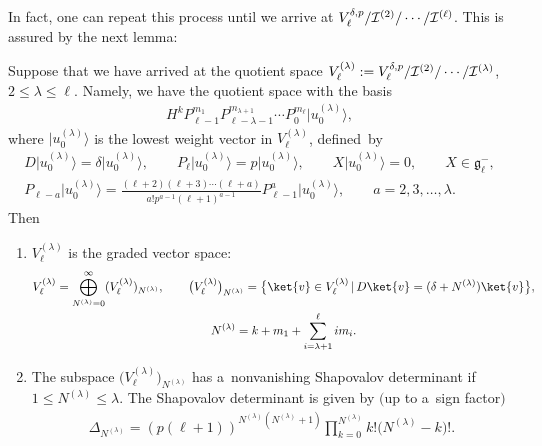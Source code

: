 In fact, one can repeat this process until we arrive at $ V^{\delta,p}_{\ell}/{\cal I}^{(2)}/\cdots/{\cal I}^{(\ell)}$.
This is assured by the next lemma:
\begin{lemma}
\label{lemma5}
Suppose that we have arrived at the quotient space $ V_{\ell}^{(\lambda)}:= V^{\delta,p}_{\ell}/{\cal
I}^{(2)}/\cdots/{\cal I}^{(\lambda)}$, $2 \leq \lambda \leq \ell$.
Namely, we have the quotient space with the basis
\begin{gather*}
H^k P_{\ell-1}^{m_1} P_{\ell-\lambda-1}^{m_{\lambda+1}} \cdots P_0^{m_{\ell}} \big|u_0^{(\lambda)}\big\rangle ,
\end{gather*}
where $ \big|u_0^{(\lambda)}\big\rangle  $ is the lowest weight vector in $ V_{\ell}^{(\lambda)} $, defined~by
\begin{gather}
    D \big|u_0^{(\lambda)}\big\rangle  = \delta \big|u_0^{(\lambda)}\big\rangle ,
\qquad
P_{\ell} \big|u_0^{(\lambda)}\big\rangle  = p \big|u_0^{(\lambda)}\big\rangle ,
\qquad
X \big|u_0^{(\lambda)}\big\rangle  = 0, \qquad X \in {\mathfrak g}_{\ell}^-,
\nonumber
\\      P_{\ell-a} \big|u_0^{(\lambda)}\big\rangle  = \frac{(\ell+2) (\ell+3) \cdots (\ell+a)}{a!   p^{a-1}   (\ell+1)^{a-1}}
P_{\ell-1}^a \big|u_0^{(\lambda)}\big\rangle ,
\qquad
a = 2, 3, \dots, \lambda.
\label{Assumption-lambda}
\end{gather}
Then
\begin{enumerate}\itemsep=0pt
\item[$i)$] $ V_{\ell}^{(\lambda)} $ is the graded vector space:
\begin{gather*}
    V_{\ell}^{(\lambda)} = \bigoplus_{N^{(\lambda)}=0}^{\infty} (V_{\ell}^{(\lambda)})_{N^{(\lambda)}},
\qquad
\big(V_{\ell}^{(\lambda)}\big)_{N^{(\lambda)}} = \big\{ \ket{v} \in V_{\ell}^{(\lambda)} \, | \, D \ket{v} = (\delta +
N^{(\lambda)}) \ket{v} \big\},
\nonumber
\\
    N^{(\lambda)} = k + m_1 + \sum\limits_{i=\lambda+1}^{\ell} i m_i.
\end{gather*}
\item[$ii)$] The subspace $ \big(V_{\ell}^{(\lambda)}\big)_{N^{(\lambda)}} $ has a~nonvanishing Shapovalov determinant if $ 1 \leq
N^{(\lambda)} \leq \lambda$.
The Shapovalov determinant is given by $($up to a~sign factor$)$
\begin{gather}
\Delta_{N^{(\lambda)}} = (p  (\ell+1))^{N^{(\lambda)}(N^{(\lambda)}+1)} \prod\limits_{k=0}^{N^{(\lambda)}} k!
\big(N^{(\lambda)}-k\big)!.
\label{KDinQuotient}

\end{gather}
\end{enumerate}
\end{lemma}
